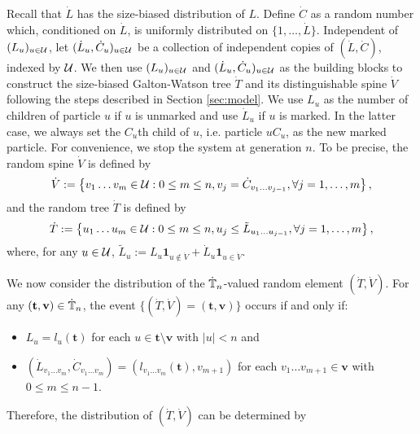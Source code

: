 \documentclass[12pt]{amsart}
\numberwithin{equation}{section}
\newcommand{\ind}[1]{\mathbf 1_{#1}}
\newcommand{\abs}[1]{\left| #1 \right|}
\newcommand{\set}[1]{\left\{ #1 \right\}}
\newcommand{\tree}{\mathbf t}
\newcommand{\spine}{\mathbf v}
\begin{document}
\par
	Recall that $\dot L$ has the size-biased distribution of $L$. 
	Define $\dot C$ as a random number which, conditioned on $\dot L$, is uniformly distributed on 
	$\{1,\dots,\dot L\}$. 
	Independent of $(L_u)_{u\in\mathcal U}$, let $(\dot L_u,\dot C_u)_{u\in \mathcal U}$ be a collection of independent copies of $(\dot L,\dot C)$, indexed by $\mathcal U$.  
	We then use $(L_u)_{u\in\mathcal U}$ and $(\dot L_u,\dot C_u)_{u\in\mathcal U}$ as the building blocks to construct the size-biased Galton-Watson tree $\dot T$ and its distinguishable spine $\dot V$ following the steps described in Section \ref{sec:model}. 
	We use $L_u$ as the number of children of particle $u$ if $u$ is unmarked and use $\dot L_u$ if $u$ is marked. 
	In the latter case, we always set the $C_u$th child of $u$, i.e. particle $uC_u$, as the new marked particle. 
	For convenience, we stop the system at generation $n$. To be precise, the random spine $\dot V$ is defined by
\begin{equation*}
		\dot V
	:=
	\set{v_1\dots v_m\in \cU:0\le m\le n, v_j=\dot C_{v_1\dots v_{j-1}},\forall j=1,\dots,m},
\end{equation*}
	and the random tree $\dot T$ is defined by
\begin{equation*}
		\dot T
	:=
		\set{u_1\dots u_m\in\cU: 0\le m\le n,u_j\leq \tilde L_{u_1\dots u_{j-1}},\forall j=1,\dots,m},
\end{equation*}
	where, for any $u\in\mathcal U$, $\tilde L_u:=L_u\ind{u\not\in \dot V}+\dot L_u\ind{u\in \dot V}$.
\par
	We now consider the distribution of the $\dot{\mathbb T}_n$-valued random element $(\dot T,\dot V)$. 
	For any $(\tree,\spine)\in\dot\bbT_n$, the event $\{(\dot T,\dot V)=(\tree,\spine)\}$ occurs if and only if:
\begin{itemize}
\item
    $L_u=l_u(\tree)$ for each $u\in \tree\setminus\spine$ with $\abs{u}<n$ and
\item
	$(\dot L_{v_1\dots v_m},\dot C_{v_1\dots v_m})=(l_{v_1\dots v_m}(\tree),v_{m+1})$ for each $v_1\dots v_{m+1}\in\spine$ with $0\le m\le n-1$.
\end{itemize}
    Therefore, the distribution of $(\dot T,\dot V)$ can be determined by
\end{document}
